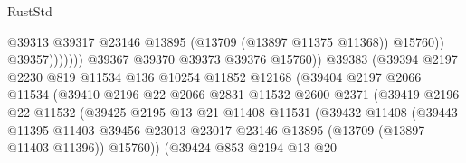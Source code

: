 \begin{lexlean}{RustStd}
\begin{coremodule}
                                                @39313
                                                @39317
                                                @23146
                                                @13895
                                                (@13709 (@13897 @11375 @11368))
                                                @15760))
                                            @39357)))))))
                              @39367
                              @39370
                              @39373
                              @39376
                              @15760))
                          @39383
                          (@39394
                            @2197
                            @2230
                            @819
                            @11534
                            @136
                            @10254
                            @11852
                            @12168
                            (@39404
                              @2197
                              @2066
                              @11534
                              (@39410
                                @2196
                                @22
                                @2066
                                @2831
                                @11532
                                @2600
                                @2371
                                (@39419
                                  @2196
                                  @22
                                  @11532
                                  (@39425
                                    @2195
                                    @13
                                    @21
                                    @11408
                                    @11531
                                    (@39432
                                      @11408
                                      (@39443
                                        @11395
                                        @11403
                                        @39456
                                        @23013
                                        @23017
                                        @23146
                                        @13895
                                        (@13709 (@13897 @11403 @11396))
                                        @15760))
                                    (@39424
                                      @853
                                      @2194
                                      @13
                                      @20

\end{coremodule}
\end{lexlean}
